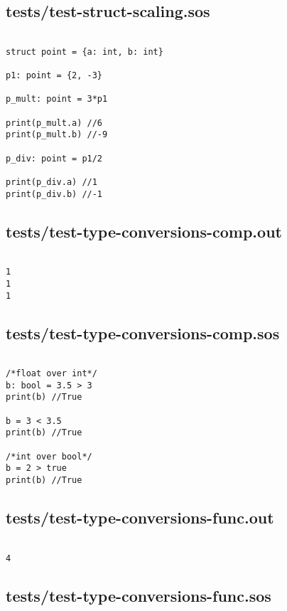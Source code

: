 \documentclass[main.tex]{subfiles}
\begin{document}
\subsection{tests/test-struct-scaling.sos}

\begin{lstlisting}

struct point = {a: int, b: int}

p1: point = {2, -3}

p_mult: point = 3*p1

print(p_mult.a) //6
print(p_mult.b) //-9

p_div: point = p1/2

print(p_div.a) //1
print(p_div.b) //-1

\end{lstlisting}

\subsection{tests/test-type-conversions-comp.out}

\begin{lstlisting}

1
1
1
\end{lstlisting}

\subsection{tests/test-type-conversions-comp.sos}

\begin{lstlisting}

/*float over int*/
b: bool = 3.5 > 3
print(b) //True

b = 3 < 3.5
print(b) //True

/*int over bool*/
b = 2 > true
print(b) //True
\end{lstlisting}

\subsection{tests/test-type-conversions-func.out}

\begin{lstlisting}

4
\end{lstlisting}

\subsection{tests/test-type-conversions-func.sos}
\end{document}
